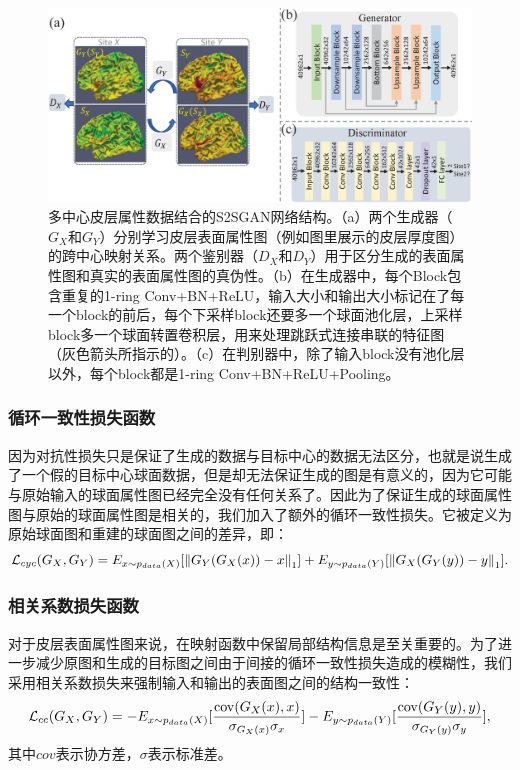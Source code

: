 \begin{figure}[t]
	\centering
	\includegraphics[width=\linewidth]{figure/s2sgan_architecture.eps}
	\caption{多中心皮层属性数据结合的S2SGAN网络结构。（a）两个生成器（$G_X$和$G_Y$）分别学习皮层表面属性图（例如图里展示的皮层厚度图）的跨中心映射关系。两个鉴别器（$D_X$和$D_Y$）用于区分生成的表面属性图和真实的表面属性图的真伪性。（b）在生成器中，每个Block包含重复的1-ring Conv+BN+ReLU，输入大小和输出大小标记在了每一个block的前后，每个下采样block还要多一个球面池化层，上采样block多一个球面转置卷积层，用来处理跳跃式连接串联的特征图（灰色箭头所指示的）。（c）在判别器中，除了输入block没有池化层以外，每个block都是1-ring Conv+BN+ReLU+Pooling。}\label{fig:s2sgan_architecture} 
\end{figure} 
	
\subsubsection{循环一致性损失函数}
因为对抗性损失只是保证了生成的数据与目标中心的数据无法区分，也就是说生成了一个假的目标中心球面数据，但是却无法保证生成的图是有意义的，因为它可能与原始输入的球面属性图已经完全没有任何关系了。因此为了保证生成的球面属性图与原始的球面属性图是相关的，我们加入了额外的循环一致性损失\cite{zhu2017unpaired}。它被定义为原始球面图和重建的球面图之间的差异，即：
\begin{equation}
	   	{{\cal L}_{cyc}}({G_X},{G_Y}) = {E_{x\sim{p_{data}}(X)}}[{\left\| {{G_Y}({G_X}(x)) - x} \right\|_1}] + {E_{y\sim{p_{data}}(Y)}}[{\left\| {{G_X}({G_Y}(y)) - y} \right\|_1}]. 
\end{equation}

\subsubsection{相关系数损失函数}
对于皮层表面属性图来说，在映射函数中保留局部结构信息是至关重要的。为了进一步减少原图和生成的目标图之间由于间接的循环一致性损失造成的模糊性，我们采用相关系数损失来强制输入和输出的表面图之间的结构一致性：
\begin{equation}
	{{\cal L}_{cc}}({G_X},{G_Y}) =  - {E_{x\sim{p_{data}}(X)}}[\frac{{{\mathop{\rm cov}} ({G_X}(x),x)}}{{{\sigma _{{G_X}(x)}}{\sigma _x}}}] - {E_{y\sim{p_{data}}(Y)}}[\frac{{{\mathop{\rm cov}} ({G_Y}(y),y)}}{{{\sigma _{{G_Y}(y)}}{\sigma _y}}}],
\end{equation}
其中$cov$表示协方差，$\sigma$表示标准差。
	
